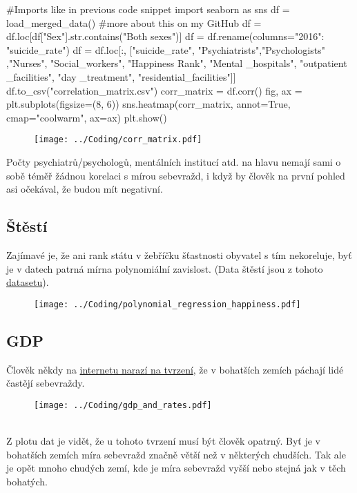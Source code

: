\documentclass[12pt]{article}
\begin{document}
\begin{python}
#Imports like in previous code snippet
import seaborn as sns
df = load_merged_data() #more about this on my GitHub
df = df.loc[df["Sex"].str.contains("Both sexes")]
df = df.rename(columns={"2016": "suicide_rate"})
df = df.loc[:, ["suicide_rate", "Psychiatrists","Psychologists" ,"Nurses", "Social_workers", "Happiness Rank", "Mental _hospitals", "outpatient _facilities", "day _treatment", "residential_facilities"]]
df.to_csv("correlation_matrix.csv")
corr_matrix = df.corr()
fig, ax = plt.subplots(figsize=(8, 6))
sns.heatmap(corr_matrix, annot=True, cmap="coolwarm", ax=ax)
plt.show()
\end{python}
\newpage
\begin{figure}[hbt]
  \centering
  \texttt{[image: ../Coding/corr\_matrix.pdf]}
  \label{fig:plot}
\end{figure}

Počty psychiatrů/psychologů, mentálních institucí atd. na hlavu nemají sami o sobě téměř žádnou korelaci s mírou sebevražd, i když by člověk na první pohled asi očekával, že budou mít negativní. 
\subsection{Štěstí}
Zajímavé je, že ani rank státu v žebříčku šťastnosti obyvatel s tím nekoreluje, byť je v datech patrná mírna polynomiální zavislost. (Data štěstí jsou z tohoto \href{https://www.kaggle.com/datasets/unsdsn/world-happiness}{datasetu}). 

\begin{figure}[hbt]
  \centering
  \texttt{[image: ../Coding/polynomial\_regression\_happiness.pdf]}
  \label{fig:plot}
\end{figure}

\subsection{GDP} Člověk někdy na \href{https://www.youtube.com/watch?v=brEU5j4IsxU}{internetu narazí na tvrzení}, že v bohatších zemích páchají lidé častějí sebevraždy.
\begin{figure}[hbt]
  \centering
  \texttt{[image: ../Coding/gdp\_and\_rates.pdf]}
  \label{fig:plot}
\end{figure} \\
Z plotu dat je vidět, že u tohoto tvrzení musí být člověk opatrný. Byť je v bohatších zemích míra sebevražd značně větší než v některých chudších. Tak ale je opět mnoho chudých zemí, kde je míra sebevražd vyšší nebo stejná jak v těch bohatých.
\end{document}
